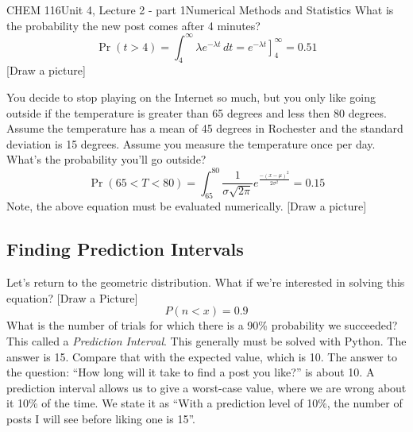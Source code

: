 \documentclass{article}
\begin{document}
\begin{tdoc}{CHEM 116}{Unit 4, Lecture 2 - part 1}{Numerical Methods and Statistics}
What is the probability the new post comes after 4 minutes?
\[
\Pr(t > 4) = \int_4^{\infty}  \lambda e^{-\lambda t}\,dt = \left.e^{-\lambda t}\right]_4^{\infty} = 0.51
\]
[Draw a picture]

You decide to stop playing on the Internet so much, but you only like
going outside if the temperature is greater than 65 degrees and less
then 80 degrees. Assume the temperature has a mean of 45 degrees in
Rochester and the standard deviation is 15 degrees. Assume you measure
the temperature once per day. What's the probability you'll go outside?
\[
\Pr(65 < T < 80) = \int_{65}^{80} \frac{1}{\sigma\sqrt{2\pi}}e^{\frac{-(x - \mu)^2}{2\sigma ^2}} = 0.15
\]
Note, the above equation must be evaluated numerically. [Draw a
  picture]

\subsection{Finding Prediction Intervals}

Let's return to the geometric distribution. What if we're interested
in solving this equation? [Draw a Picture]
\[
P(n < x) = 0.9
\] 
What is the number of trials for which there is a 90\% probability we
succeeded? This called a \emph{Prediction Interval}. This generally
must be solved with Python. The answer is 15. Compare that with the
expected value, which is 10. The answer to the question: ``How long
will it take to find a post you like?'' is about 10. A prediction
interval allows us to give a worst-case value, where we are wrong
about it 10\% of the time. We state it as ``With a prediction level of
10\%, the number of posts I will see before liking one is 15''.


\end{tdoc}
\end{document}
